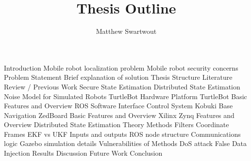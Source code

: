 \documentclass{article}
\begin{document}
\title{Thesis Outline}
\author{Matthew Swartwout}
\maketitle

\begin{outline}
\1 Introduction
    \2 Mobile robot localization problem
    \2 Mobile robot security concerns
    \2 Problem Statement
    \2 Brief explanation of solution
    \2 Thesis Structure
\1 Literature Review / Previous Work
    \2 Secure State Estimation
    \2 Distributed State Estimation
    \2 Noise Model for Simulated Robots
    \2 TurtleBot
\1 Hardware Platform
    \2 TurtleBot
        \3 Basic Features and Overview
        \3 ROS Software Interface
        \3 Control System
            \4 Kobuki Base
            \4 Navigation
    \2 ZedBoard
        \3 Basic Features and Overview
        \3 Xilinx Zynq Features and Overview
\1 Distributed State Estimation
    \2 Theory
    \2 Methods
        \3 Filters
            \4 Coordinate Frames
            \4 EKF vs UKF
            \4 Inputs and outputs
        \3 ROS node structure
        \3 Communications logic
        \3 Gazebo simulation details
    \2 Vulnerabilities of Methods
        \3 DoS attack
        \3 False Data Injection
\1 Results
\1 Discussion
    \2 Future Work
\1 Conclusion
\end{outline}
\end{document}
